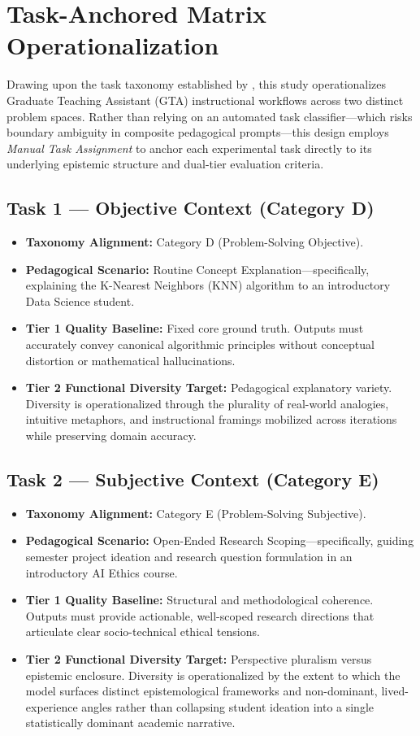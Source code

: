 \section{Task-Anchored Matrix Operationalization}
Drawing upon the task taxonomy established by \cite{Jain2025}, this study operationalizes Graduate Teaching Assistant (GTA) instructional workflows across two distinct problem spaces. Rather than relying on an automated task classifier—which risks boundary ambiguity in composite pedagogical prompts—this design employs \textit{Manual Task Assignment} to anchor each experimental task directly to its underlying epistemic structure and dual-tier evaluation criteria.

\subsection{Task 1 --- Objective Context (Category D)}
\begin{itemize}
  \item \textbf{Taxonomy Alignment:} Category D (Problem-Solving Objective).
  \item \textbf{Pedagogical Scenario:} Routine Concept Explanation---specifically, explaining the K-Nearest Neighbors (KNN) algorithm to an introductory Data Science student.
  \item \textbf{Tier 1 Quality Baseline:} Fixed core ground truth. Outputs must accurately convey canonical algorithmic principles without conceptual distortion or mathematical hallucinations.
  \item \textbf{Tier 2 Functional Diversity Target:} Pedagogical explanatory variety. Diversity is operationalized through the plurality of real-world analogies, intuitive metaphors, and instructional framings mobilized across iterations while preserving domain accuracy.
\end{itemize}

\subsection{Task 2 --- Subjective Context (Category E)}
\begin{itemize}
  \item \textbf{Taxonomy Alignment:} Category E (Problem-Solving Subjective).
  \item \textbf{Pedagogical Scenario:} Open-Ended Research Scoping---specifically, guiding semester project ideation and research question formulation in an introductory AI Ethics course.
  \item \textbf{Tier 1 Quality Baseline:} Structural and methodological coherence. Outputs must provide actionable, well-scoped research directions that articulate clear socio-technical ethical tensions.
  \item \textbf{Tier 2 Functional Diversity Target:} Perspective pluralism versus epistemic enclosure. Diversity is operationalized by the extent to which the model surfaces distinct epistemological frameworks and non-dominant, lived-experience angles rather than collapsing student ideation into a single statistically dominant academic narrative.
\end{itemize}

